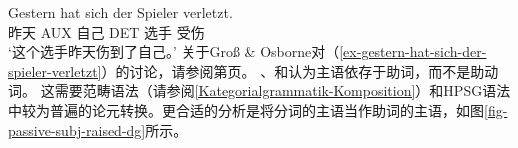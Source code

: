 {%
\ea
\label{ex-gestern-hat-sich-der-spieler-verletzt}
\gll Gestern hat sich der Spieler verletzt.\\
     昨天 AUX 自己 DET 选手 受伤\\
\glt `这个选手昨天伤到了自己。'
\z
关于Groß \& Osborne对（\ref{ex-gestern-hat-sich-der-spieler-verletzt}）的讨论，请参阅第\pageref{fig-gestern-hat-sich-der-spieler-verletzt-dg-rising}页。
} 
\citet{Hudson90a-u}、\citet[\S~5.3]{Eroms2000a}和\citet{GO2009a}认为主语依存于助词，而不是助动词。
%
%
%
%
这需要范畴语法（请参阅\ref{Kategorialgrammatik-Komposition}）和HPSG语法\citep{HN94a}中较为普遍的论元转换。更合适的分析是将分词的主语当作助词的主语，如图\vref{fig-passive-subj-raised-dg}所示。
